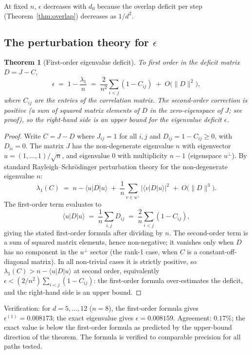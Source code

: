 \documentclass[11pt,a4paper]{article}
\newtheorem{theorem}{Theorem}[section]
\begin{document}
\noindent At fixed $n$, $\epsilon$ decreases with $d_0$ because the overlap deficit per step (Theorem~\ref{thm:overlap}) decreases as $1/d^2$.

\subsection{The perturbation theory for \texorpdfstring{$\epsilon$}{epsilon}}\label{sec:perturbation}

\begin{theorem}[First-order eigenvalue deficit]\label{thm:pert}
To first order in the deficit matrix $D = J - C$,
\[
\epsilon \;=\; 1 - \frac{\lambda_1}{n} \;=\; \frac{2}{n^2} \sum_{i < j} \left(1 - C_{ij}\right) \;+\; O\!\bigl(\|D\|^2\bigr),
\]
where $C_{ij}$ are the entries of the correlation matrix. The second-order correction is \emph{positive} (a sum of squared matrix elements of $D$ in the zero-eigenspace of $J$; see proof), so the right-hand side is an \emph{upper bound} for the eigenvalue deficit $\epsilon$.
\end{theorem}

\begin{proof}
Write $C = J - D$ where $J_{ij} = 1$ for all $i,j$ and $D_{ij} = 1 - C_{ij} \geq 0$, with $D_{ii} = 0$. The matrix $J$ has the non-degenerate eigenvalue $n$ with eigenvector $u = (1, \ldots, 1)/\sqrt{n}$, and eigenvalue $0$ with multiplicity $n - 1$ (eigenspace $u^\perp$). By standard Rayleigh--Schr\"odinger perturbation theory for the non-degenerate eigenvalue $n$:
\[
\lambda_1(C) \;=\; n - \langle u | D | u \rangle \;+\; \frac{1}{n}\sum_{v \in u^\perp}|\langle v | D | u \rangle|^2 \;+\; O\!\bigl(\|D\|^3\bigr).
\]
The first-order term evaluates to
\[
\langle u | D | u \rangle \;=\; \frac{1}{n}\sum_{i,j}D_{ij} \;=\; \frac{2}{n}\sum_{i<j}(1 - C_{ij}),
\]
giving the stated first-order formula after dividing by $n$. The second-order term is a sum of squared matrix elements, hence non-negative; it vanishes only when $D$ has no component in the $u^\perp$ sector (the rank-1 case, when $C$ is a constant-off-diagonal matrix). In all non-trivial cases it is strictly positive, so $\lambda_1(C) > n - \langle u|D|u\rangle$ at second order, equivalently $\epsilon < (2/n^2)\sum_{i<j}(1 - C_{ij})$: the first-order formula over-estimates the deficit, and the right-hand side is an upper bound.
\end{proof}

\noindent Verification: for $d = 5, \ldots, 12$ ($n = 8$), the first-order formula gives $\epsilon^{(1)} = 0.008173$; the exact eigenvalue gives $\epsilon = 0.008159$. Agreement: $0.17\%$; the exact value is below the first-order formula as predicted by the upper-bound direction of the theorem. The formula is verified to comparable precision for all paths tested.
\end{document}
